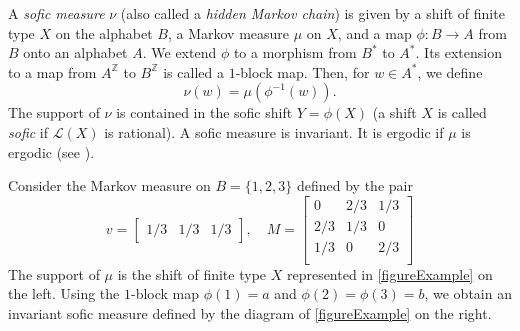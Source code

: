 \documentclass[a4paper,UKenglish,numberwithinsect,cleveref]{lipics-v2021}
\newcommand{\Z}{\mathbb{Z}}
\newcommand{\cL}{\mathcal L}
\begin{document}
A \emph{sofic measure} $\nu$ (also called a \emph{hidden Markov chain}) is given by a shift of finite type $X$ on the alphabet $B$, a Markov measure $\mu$ on $X$, and a map $\phi\colon B\to A$ from $B$ onto an alphabet $A$. We extend $\phi$ to a morphism from $B^*$ to $A^*$. Its extension to a map from $A^\Z$ to $B^\Z$ is called a $1$-block map. Then, for $w\in A^*$, we define
\[
    \nu(w)=\mu(\phi^{-1}(w)).
\]
The support of $\nu$ is contained in the sofic shift $Y=\phi(X)$ (a shift $X$ is called \emph{sofic} if $\cL(X)$ is rational). A sofic measure is invariant. It is ergodic if $\mu$ is ergodic (see \cite{BoylePetersen2011}).
\begin{example}\label{exampleBoylePetersen}
    Consider the Markov measure on $B=\{1,2,3\}$ defined by the pair 
    \[
        v=\begin{bmatrix}1/3&1/3&1/3\end{bmatrix},\quad
        M=\begin{bmatrix}0&2/3&1/3\\
        2/3& 1/3&0\\
        1/3&0&2/3\\
        \end{bmatrix}
    \]
    The support of $\mu$ is the shift of finite type $X$ represented in \cref{figureExample} on the left.  Using the $1$-block map $\phi(1)=a$ and $\phi(2)=\phi(3)=b$, we obtain an invariant sofic measure defined by the diagram of \cref{figureExample} on the right.
    \begin{figure}
        \centering
\end{figure}
\end{example}
\end{document}
